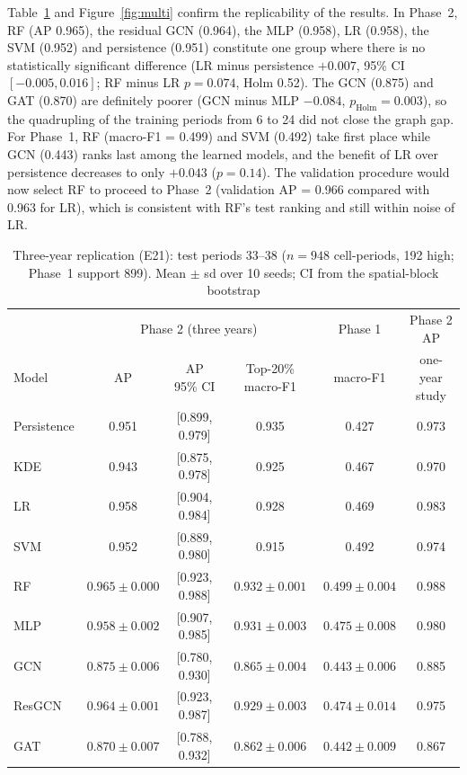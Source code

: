 \documentclass[11pt,a4paper]{report}
\begin{document}
Table~\ref{tab:multi} and Figure~\ref{fig:multi} confirm the replicability of the results. In Phase~2, RF (AP 0.965), the residual GCN (0.964), the MLP (0.958), LR (0.958), the SVM (0.952) and persistence (0.951) constitute one group where there is no statistically significant difference (LR minus persistence $+0.007$, 95\% CI $[-0.005, 0.016]$; RF minus LR $p=0.074$, Holm 0.52). The GCN (0.875) and GAT (0.870) are definitely poorer (GCN minus MLP $-0.084$, $p_\mathrm{Holm}=0.003$), so the quadrupling of the training periods from 6 to 24 did not close the graph gap. For Phase~1, RF (macro-F1 = 0.499) and SVM (0.492) take first place while GCN (0.443) ranks last among the learned models, and the benefit of LR over persistence decreases to only $+0.043$ ($p = 0.14$). The validation procedure would now select RF to proceed to Phase~2 (validation AP = 0.966 compared with 0.963 for LR), which is consistent with RF's test ranking and still within noise of LR.

\begin{table}[H]
\centering\small
\caption{Three-year replication (E21): test periods 33--38 ($n=948$ cell-periods, 192 high; Phase~1 support 899). Mean $\pm$ sd over 10 seeds; CI from the spatial-block bootstrap}
\label{tab:multi}
\begin{tabular}{@{}lccccc@{}}
\toprule
 & \multicolumn{3}{c}{Phase 2 (three years)} & Phase 1 & Phase 2 AP\\
Model & AP & AP 95\% CI & Top-20\% macro-F1 & macro-F1 & one-year study\\
\midrule
Persistence & 0.951 & [0.899, 0.979] & 0.935 & 0.427 & 0.973\\
KDE & 0.943 & [0.875, 0.978] & 0.925 & 0.467 & 0.970\\
LR & 0.958 & [0.904, 0.984] & 0.928 & 0.469 & 0.983\\
SVM & 0.952 & [0.889, 0.980] & 0.915 & 0.492 & 0.974\\
RF & $0.965\pm0.000$ & [0.923, 0.988] & $0.932\pm0.001$ & $0.499\pm0.004$ & 0.988\\
MLP & $0.958\pm0.002$ & [0.907, 0.985] & $0.931\pm0.003$ & $0.475\pm0.008$ & 0.980\\
GCN & $0.875\pm0.006$ & [0.780, 0.930] & $0.865\pm0.004$ & $0.443\pm0.006$ & 0.885\\
ResGCN & $0.964\pm0.001$ & [0.923, 0.987] & $0.929\pm0.003$ & $0.474\pm0.014$ & 0.975\\
GAT & $0.870\pm0.007$ & [0.788, 0.932] & $0.862\pm0.006$ & $0.442\pm0.009$ & 0.867\\
\bottomrule
\end{tabular}
\end{table}
\end{document}
